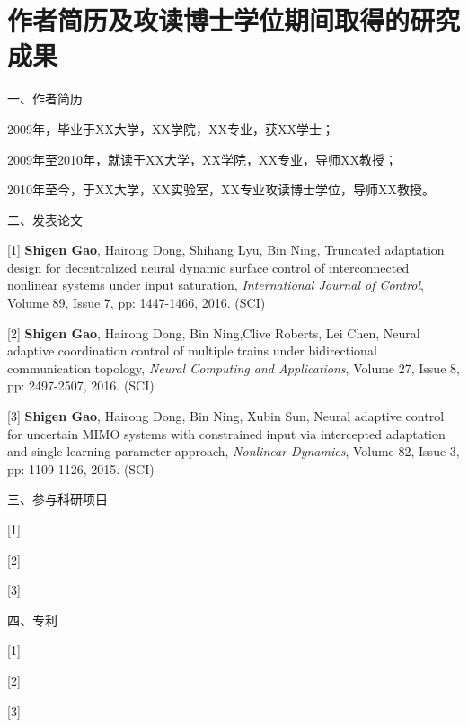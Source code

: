 \chapter{作者简历及攻读博士学位期间取得的研究成果}
\setlength{\parindent}{0pt}


一、作者简历

2009年，毕业于XX大学，XX学院，XX专业，获XX学士；

2009年至2010年，就读于XX大学，XX学院，XX专业，导师XX教授；

2010年至今，于XX大学，XX实验室，XX专业攻读博士学位，导师XX教授。

\vspace{10pt}
二、发表论文

[1] \textbf{Shigen Gao}, Hairong Dong, Shihang Lyu, Bin Ning, Truncated adaptation design for decentralized neural dynamic surface control of interconnected nonlinear systems under input saturation, \emph{International Journal of Control}, Volume 89, Issue 7, pp: 1447-1466, 2016. (SCI)\vspace{-5pt}

[2] \textbf{Shigen Gao}, Hairong Dong, Bin Ning,Clive Roberts, Lei Chen, Neural adaptive coordination control of multiple trains under bidirectional communication topology, \emph{Neural Computing and Applications}, Volume 27, Issue 8, pp: 2497-2507, 2016. (SCI)

[3] \textbf{Shigen Gao}, Hairong Dong, Bin Ning, Xubin Sun, Neural adaptive control for uncertain MIMO systems with constrained input via intercepted adaptation and single learning parameter approach, \emph{Nonlinear Dynamics}, Volume 82, Issue 3, pp: 1109-1126, 2015. (SCI)


\vspace{10pt}
三、参与科研项目

[1]

[2]

[3]

\vspace{10pt}
四、专利

[1]

[2]

[3]


%
%
%
%
%    
%

